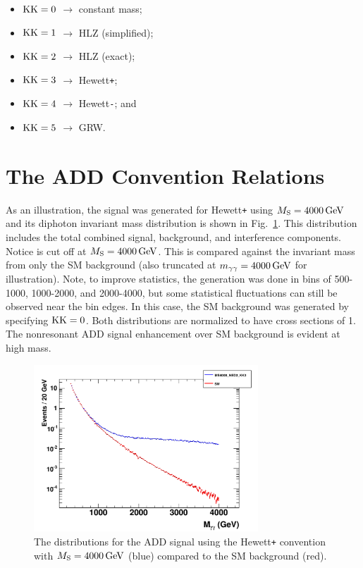 \begin{itemize}
	\item $\mathrm{KK}=0$ $\rightarrow$ constant mass;
	\item $\mathrm{KK}=1$ $\rightarrow$ HLZ (simplified);
	\item $\mathrm{KK}=2$ $\rightarrow$ HLZ (exact);
	\item $\mathrm{KK}=3$ $\rightarrow$ Hewett\texttt{+};
	\item $\mathrm{KK}=4$ $\rightarrow$ Hewett\texttt{-}; and
	\item $\mathrm{KK}=5$ $\rightarrow$ GRW.
\end{itemize}


\section{The ADD Convention Relations}

As an illustration, the signal was generated for Hewett\texttt{+} using $M_{\rm S} = 4000\,\text{Ge\hspace{-.08em}V}$ and its diphoton invariant mass \Mgg distribution is shown in Fig.~\ref{fig:ADD_with_SM}. This distribution includes the total combined signal, background, and interference components. Notice \Mgg is cut off at $M_{\rm S} = 4000\,\text{Ge\hspace{-.08em}V}$. This is compared against the invariant mass from only the SM background (also truncated at $m_{\gamma\gamma} = 4000\,\text{Ge\hspace{-.08em}V}$ for illustration). Note, to improve statistics, the generation was done in \Mgg bins of 500-1000, 1000-2000, and 2000-4000\GeV, but some statistical fluctuations can still be observed near the bin edges. In this case, the SM background was generated by specifying $\mathrm{KK}=0$. Both distributions are normalized to have cross sections of 1\fbinv. The nonresonant ADD signal enhancement over SM background is evident at high mass.

\begin{figure}[!htbp]
  \centering
  \includegraphics[width=0.75\textwidth]{figures/Hewett_pos_with_SM_Bkg}
  \caption{The \mgg distributions for the ADD signal using the Hewett\texttt{+} convention with $M_{\rm S} = 4000\,\text{Ge\hspace{-.08em}V}$ (blue) compared to the SM background (red).}
  \label{fig:ADD_with_SM}
\end{figure}

